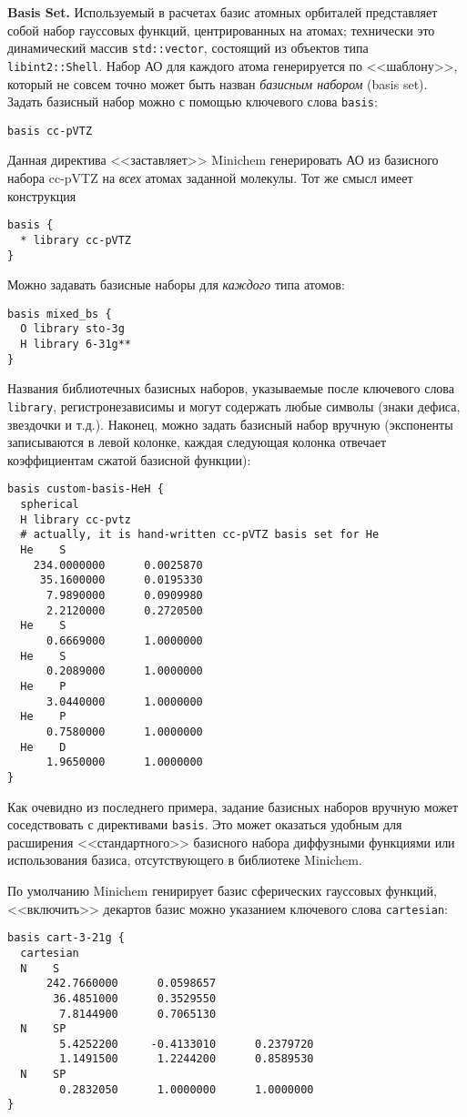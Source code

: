 \documentclass[a4paper]{book}
\begin{document}
\textbf{Basis Set.} Используемый в расчетах базис атомных орбиталей представляет собой набор гауссовых функций, центрированных на атомах;
технически это динамический массив \texttt{std::vector}, состоящий из объектов типа \texttt{libint2::Shell}.
Набор АО для каждого атома генерируется по <<шаблону>>, который не совсем точно может быть назван \textit{базисным набором} (basis set).
Задать базисный набор можно с помощью ключевого слова \texttt{basis}:
\begin{lstlisting}
basis cc-pVTZ
\end{lstlisting}
Данная директива <<заставляет>> Minichem генерировать АО из базисного набора cc-pVTZ на \textit{всех} атомах заданной молекулы.
Тот же смысл имеет конструкция
\begin{lstlisting}
basis {
  * library cc-pVTZ
}
\end{lstlisting}
Можно задавать базисные наборы для \textit{каждого} типа атомов:
\begin{lstlisting}
basis mixed_bs {
  O library sto-3g
  H library 6-31g**
}
\end{lstlisting}
Названия библиотечных базисных наборов, указываемые после ключевого слова \texttt{library}, регистронезависимы и могут содержать любые символы
(знаки дефиса, звездочки и т.д.).
Наконец, можно задать базисный набор вручную (экспоненты записываются в левой колонке, каждая следующая колонка отвечает коэффициентам
сжатой базисной функции):
\begin{lstlisting}
basis custom-basis-HeH {
  spherical
  H library cc-pvtz
  # actually, it is hand-written cc-pVTZ basis set for He
  He    S
    234.0000000      0.0025870
     35.1600000      0.0195330
      7.9890000      0.0909980
      2.2120000      0.2720500
  He    S
      0.6669000      1.0000000
  He    S
      0.2089000      1.0000000
  He    P
      3.0440000      1.0000000
  He    P
      0.7580000      1.0000000
  He    D
      1.9650000      1.0000000
}
\end{lstlisting}
Как очевидно из последнего примера, задание базисных наборов вручную может соседствовать с директивами \texttt{basis}. Это может оказаться
удобным для расширения <<стандартного>> базисного набора диффузными функциями или использования базиса, отсутствующего в библиотеке Minichem.

По умолчанию Minichem генирирует базис сферических гауссовых функций, <<включить>> декартов базис можно указанием ключевого слова \texttt{cartesian}:
\begin{lstlisting}
basis cart-3-21g {
  cartesian
  N    S
      242.7660000      0.0598657
       36.4851000      0.3529550
        7.8144900      0.7065130
  N    SP
        5.4252200     -0.4133010      0.2379720
        1.1491500      1.2244200      0.8589530
  N    SP
        0.2832050      1.0000000      1.0000000
}
\end{lstlisting}
\end{document}
